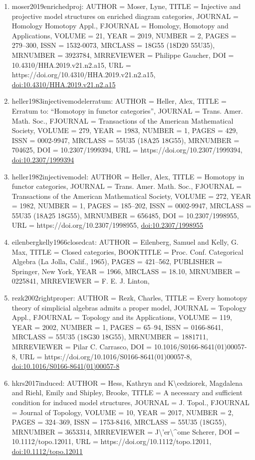 \documentclass[11pt]{article}
\begin{document}
\begin{enumerate}[leftmargin=*]
  \item moser2019enrichedproj: AUTHOR = Moser, Lyne, TITLE = Injective and projective model structures on enriched diagram categories, JOURNAL = Homology Homotopy Appl., FJOURNAL = Homology, Homotopy and Applications, VOLUME = 21, YEAR = 2019, NUMBER = 2, PAGES = 279--300, ISSN = 1532-0073, MRCLASS = 18G55 (18D20 55U35), MRNUMBER = 3923784, MRREVIEWER = Philippe Gaucher, DOI = 10.4310/HHA.2019.v21.n2.a15, URL = https://doi.org/10.4310/HHA.2019.v21.n2.a15, \href{https://doi.org/10.4310/HHA.2019.v21.n2.a15}{doi:10.4310/HHA.2019.v21.n2.a15}
  \item heller1983injectivemodelerratum: AUTHOR = Heller, Alex, TITLE = Erratum to: ``Homotopy in functor categories'', JOURNAL = Trans. Amer. Math. Soc., FJOURNAL = Transactions of the American Mathematical Society, VOLUME = 279, YEAR = 1983, NUMBER = 1, PAGES = 429, ISSN = 0002-9947, MRCLASS = 55U35 (18A25 18G55), MRNUMBER = 704625, DOI = 10.2307/1999394, URL = https://doi.org/10.2307/1999394, \href{https://doi.org/10.2307/1999394}{doi:10.2307/1999394}
  \item heller1982injectivemodel: AUTHOR = Heller, Alex, TITLE = Homotopy in functor categories, JOURNAL = Trans. Amer. Math. Soc., FJOURNAL = Transactions of the American Mathematical Society, VOLUME = 272, YEAR = 1982, NUMBER = 1, PAGES = 185--202, ISSN = 0002-9947, MRCLASS = 55U35 (18A25 18G55), MRNUMBER = 656485, DOI = 10.2307/1998955, URL = https://doi.org/10.2307/1998955, \href{https://doi.org/10.2307/1998955}{doi:10.2307/1998955}
  \item eilenbergkelly1966closedcat: AUTHOR = Eilenberg, Samuel and Kelly, G. Max, TITLE = Closed categories, BOOKTITLE = Proc. Conf. Categorical Algebra (La Jolla, Calif., 1965), PAGES = 421--562, PUBLISHER = Springer, New York, YEAR = 1966, MRCLASS = 18.10, MRNUMBER = 0225841, MRREVIEWER = F. E. J. Linton,
  \item rezk2002rightproper: AUTHOR = Rezk, Charles, TITLE = Every homotopy theory of simplicial algebras admits a proper model, JOURNAL = Topology Appl., FJOURNAL = Topology and its Applications, VOLUME = 119, YEAR = 2002, NUMBER = 1, PAGES = 65--94, ISSN = 0166-8641, MRCLASS = 55U35 (18G30 18G55), MRNUMBER = 1881711, MRREVIEWER = Pilar C. Carrasco, DOI = 10.1016/S0166-8641(01)00057-8, URL = https://doi.org/10.1016/S0166-8641(01)00057-8, \href{https://doi.org/10.1016/S0166-8641(01)00057-8}{doi:10.1016/S0166-8641(01)00057-8}
  \item hkrs2017induced: AUTHOR = Hess, Kathryn and K\textbackslash{}cedziorek, Magdalena and Riehl, Emily and Shipley, Brooke, TITLE = A necessary and sufficient condition for induced model structures, JOURNAL = J. Topol., FJOURNAL = Journal of Topology, VOLUME = 10, YEAR = 2017, NUMBER = 2, PAGES = 324--369, ISSN = 1753-8416, MRCLASS = 55U35 (18G55), MRNUMBER = 3653314, MRREVIEWER = J\textbackslash{}'er\textbackslash{}\^{}ome Scherer, DOI = 10.1112/topo.12011, URL = https://doi.org/10.1112/topo.12011, \href{https://doi.org/10.1112/topo.12011}{doi:10.1112/topo.12011}

\end{enumerate}
\end{document}

